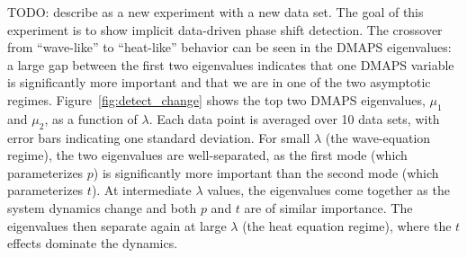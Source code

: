 \documentclass[prl, reprint, final, showkeys]{revtex4-1}
\begin{document}
TODO: describe as a new experiment with a new data set. The goal of this experiment is to show implicit data-driven phase shift detection.
The crossover from ``wave-like'' to ``heat-like'' behavior can be seen in the DMAPS eigenvalues: a large gap between the first two eigenvalues indicates that one DMAPS variable is significantly more important and that we are in one of the two asymptotic regimes.
%
Figure~\ref{fig:detect_change} shows the top two DMAPS eigenvalues, $\mu_1$ and $\mu_2$, as a function of $\lambda$. 
%
Each data point is averaged over 10 data sets, with error bars indicating one standard deviation. 
%
For small $\lambda$ (the wave-equation regime), the two eigenvalues are well-separated, as the first mode (which parameterizes $p$) is significantly more important than the second mode (which parameterizes $t$).
%
At intermediate $\lambda$ values, the eigenvalues come together as the system dynamics change and both $p$ and $t$ are of similar importance.
%
The eigenvalues then separate again at large $\lambda$ (the heat equation regime), where the $t$ effects dominate the dynamics.

\end{document}
